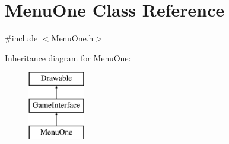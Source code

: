 \hypertarget{class_menu_one}{}\section{Menu\+One Class Reference}
\label{class_menu_one}


{\ttfamily \#include $<$Menu\+One.\+h$>$}

Inheritance diagram for Menu\+One\+:\begin{figure}[H]
\begin{center}
\leavevmode
\includegraphics[height=3.000000cm]{class_menu_one}
\end{center}
\end{figure}
